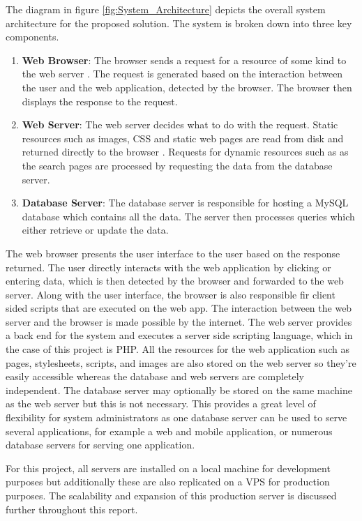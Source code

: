 The diagram in figure \ref{fig:System_Architecture} depicts the overall system architecture for the proposed solution. The system is broken down into three key components.
\begin{enumerate}
	\item \textbf{Web Browser}: The browser sends a request for a resource of some kind to the web server \cite{AppThena:SystemArchitecture}. The request is generated based on the interaction between the user and the web application, detected by the browser. The browser then displays the response to the request.
	\item \textbf{Web Server}: The web server decides what to do with the request. Static resources such as images, CSS and static web pages are read from disk and returned directly to the browser \cite{AppThena:SystemArchitecture}. Requests for dynamic resources such as as the search pages are processed by requesting the data from the database server.
	\item \textbf{Database Server}: The database server is responsible for hosting a MySQL database which contains all the data. The server then processes queries which either retrieve or update the data.
\end{enumerate}

The web browser presents the user interface to the user based on the response returned. The user directly interacts with the web application by clicking or entering data, which is then detected by the browser and forwarded to the web server. Along with the user interface, the browser is also responsible fir client sided scripts that are executed on the web app. The interaction between the web server and the browser is made possible by the internet. The web server provides a back end for the system and executes a server side scripting language, which in the case of this project is PHP. All the resources for the web application such as pages, stylesheets, scripts, and images are also stored on the web server so they're easily accessible whereas the database and web servers are completely independent. The database server may optionally be stored on the same machine as the web server but this is not necessary. This provides a great level of flexibility for system administrators as one database server can be used to serve several applications, for example a web and mobile application, or numerous database servers for serving one application.

For this project, all servers are installed on a local machine for development purposes but additionally these are also replicated on a VPS for production purposes. The scalability and expansion of this production server is discussed further throughout this report.

